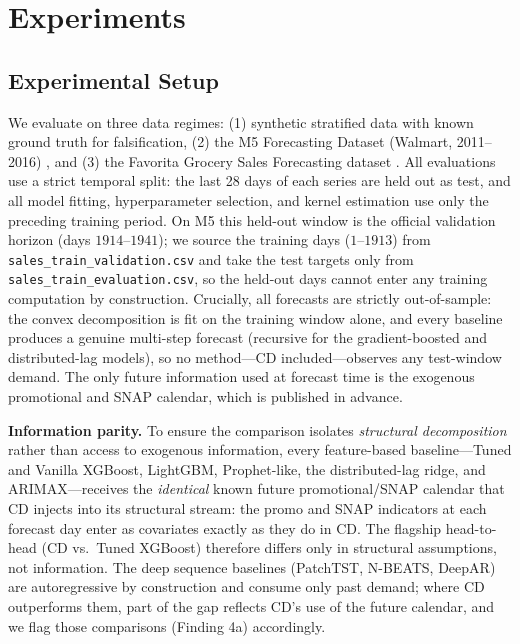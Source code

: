 \documentclass[10pt]{article} %
\theoremstyle{plain}
\theoremstyle{definition}
\begin{document}
\section{Experiments}

\subsection{Experimental Setup}

We evaluate on three data regimes: (1) synthetic stratified data with known ground truth for falsification, (2) the M5 Forecasting Dataset (Walmart, 2011--2016) \citep{makridakis2022m5}, and (3) the Favorita Grocery Sales Forecasting dataset \citep{kagglefavorita}. All evaluations use a strict temporal split: the last 28 days of each series are held out as test, and all model fitting, hyperparameter selection, and kernel estimation use only the preceding training period. On M5 this held-out window is the official validation horizon (days $1914$--$1941$); we source the training days ($1$--$1913$) from \texttt{sales\_train\_validation.csv} and take the test targets only from \texttt{sales\_train\_evaluation.csv}, so the held-out days cannot enter any training computation by construction. Crucially, all forecasts are strictly out-of-sample: the convex decomposition is fit on the training window alone, and every baseline produces a genuine multi-step forecast (recursive for the gradient-boosted and distributed-lag models), so no method---CD included---observes any test-window demand. The only future information used at forecast time is the exogenous promotional and SNAP calendar, which is published in advance.

\textbf{Information parity.} To ensure the comparison isolates \emph{structural decomposition} rather than access to exogenous information, every feature-based baseline---Tuned and Vanilla XGBoost, LightGBM, Prophet-like, the distributed-lag ridge, and ARIMAX---receives the \emph{identical} known future promotional/SNAP calendar that CD injects into its structural stream: the promo and SNAP indicators at each forecast day enter as covariates exactly as they do in CD. The flagship head-to-head (CD vs.\ Tuned XGBoost) therefore differs only in structural assumptions, not information. The deep sequence baselines (PatchTST, N-BEATS, DeepAR) are autoregressive by construction and consume only past demand; where CD outperforms them, part of the gap reflects CD's use of the future calendar, and we flag those comparisons (Finding 4a) accordingly.
\end{document}
